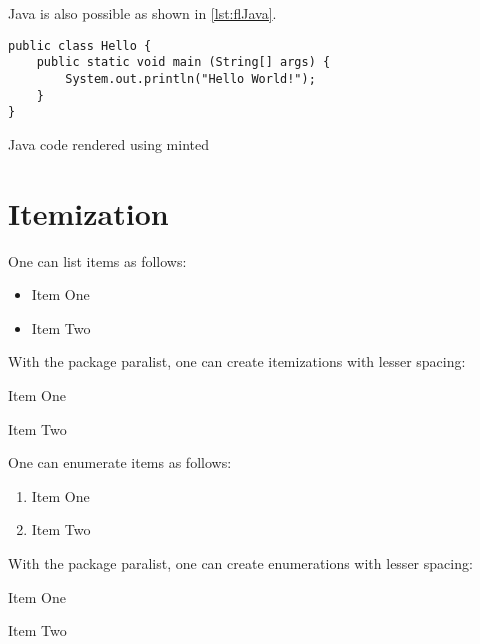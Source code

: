 \documentclass[
  fontsize=10pt,
  numbers=noenddot,
  english,  %
  paper=a5,
  twoside,  %
  DIV=calc,
  headings=small,
  bibliography=totoc,
  listof=totoc,
  draft=false
]{scrbook}
\theoremstyle{break}
\begin{document}
Java is also possible as shown in \cref{lst:flJava}.

\begin{ltgexample}
\begin{listing}[htbp]
  \begin{verbatim}
public class Hello {
    public static void main (String[] args) {
        System.out.println("Hello World!");
    }
}
\end{verbatim}
  \caption{Java code rendered using minted}
  \label{lst:flJava}
\end{listing}
\end{ltgexample}

\section{Itemization}

One can list items as follows:

\begin{ltgexample}
\begin{itemize}
  \item Item One
  \item Item Two
\end{itemize}
\end{ltgexample}

With the package paralist, one can create itemizations with lesser spacing:

\begin{ltgexample}
\begin{compactitem}
  \item Item One
  \item Item Two
\end{compactitem}
\end{ltgexample}

One can enumerate items as follows:

\begin{ltgexample}
\begin{enumerate}
  \item Item One
  \item Item Two
\end{enumerate}
\end{ltgexample}

With the package paralist, one can create enumerations with lesser spacing:

\begin{ltgexample}
\begin{compactenum}
  \item Item One
  \item Item Two
\end{compactenum}
\end{ltgexample}
\end{document}
